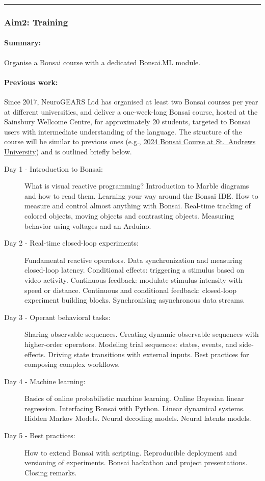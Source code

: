 \noindent\rule{\textwidth}{1pt}
\subsubsection{Aim2: Training}
\paragraph{Summary:} Organise a Bonsai course with a dedicated Bonsai.ML module.

\paragraph{Previous work:} Since 2017, NeuroGEARS Ltd has organised at least
two Bonsai courses per year at different universities, and deliver a
one-week-long Bonsai course, hosted at the Sainsbury Wellcome Centre, for
approximately 20 students, targeted to Bonsai users with intermediate
understanding of the language. The structure of the course will be similar to
previous ones (e.g., \href{https://neurogears.org/st-andrews-2024/}{2024 Bonsai
Course at St.~Andrews University}) and is outlined briefly below.

\begin{description}
    \item[Day 1 - Introduction to Bonsai:] What is visual reactive programming? Introduction to Marble diagrams and how to read them. Learning your way around the Bonsai IDE. How to measure and control almost anything with Bonsai. Real-time tracking of colored objects, moving objects and contrasting objects. Measuring behavior using voltages and an Arduino.

    \item[Day 2 - Real-time closed-loop experiments:] Fundamental reactive operators. Data synchronization and measuring closed-loop latency. Conditional effects: triggering a stimulus based on video activity. Continuous feedback: modulate stimulus intensity with speed or distance. Continuous and conditional feedback: closed-loop experiment building blocks. Synchronising asynchronous data streams.

    \item[Day 3 - Operant behavioral tasks:] Sharing observable sequences. Creating dynamic observable sequences with higher-order operators. Modeling trial sequences: states, events, and side-effects. Driving state transitions with external inputs. Best practices for composing complex workflows.

    \item[Day 4 - Machine learning:] Basics of online probabilistic machine learning. Online Bayesian linear regression. Interfacing Bonsai with Python. Linear dynamical systems. Hidden Markov Models. Neural decoding models. Neural latents models.

    \item[Day 5 - Best practices:] How to extend Bonsai with scripting. Reproducible deployment and versioning of experiments. Bonsai hackathon and project presentations. Closing remarks.
\end{description}

